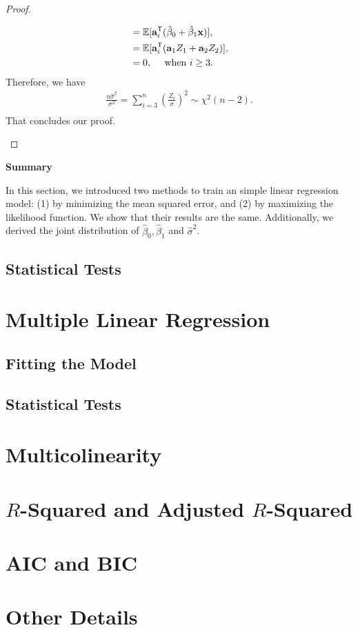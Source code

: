\documentclass{book}
\begin{document}
\begin{proof}
\begin{enumerate}
\begin{align*}
    &= \mathbb{E}[\mathbf{a}_i^{\mathsf{T}} (\hat\beta_0 + \hat\beta_1 \mathbf{x} )],\\
    &= \mathbb{E}[\mathbf{a}_i^{\mathsf{T}} (\mathbf{a}_1 Z_1 + \mathbf{a}_2 Z_2)],\\
    &= 0, \quad \text{ when }i\geq 3.
\end{align*}
Therefore, we have
\begin{align*}
    \frac{n\hat{\sigma}^2}{\sigma^2} = 
    \sum_{i=3}^{n}\left(\frac{Z_i}{\sigma}\right)^2
    \sim \chi^2(n-2).\\
\end{align*}
That concludes our proof.
\end{enumerate}
\end{proof}

\noindent \textbf{Summary} 

In this section, we introduced two methods to train an simple linear regression model: (1) by minimizing the mean squared error, and (2) by maximizing the likelihood function. We show that their results are the same. Additionally, we derived the joint distribution of $\hat{\beta}_0, \hat{\beta}_1$ and $\hat{\sigma}^2$.

\subsection{Statistical Tests}

\section{Multiple Linear Regression}

\subsection{Fitting the Model}

\subsection{Statistical Tests}

\section{Multicolinearity}

\section{$R$-Squared and Adjusted $R$-Squared}

\section{AIC and BIC}

\section{Other Details}

\ifdefined\isSubfile
\else
  
\end{document}
